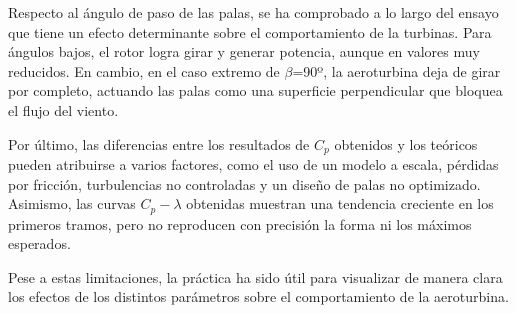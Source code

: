 \documentclass[10pt]{IEEEtran}
\begin{document}
Respecto al ángulo de paso de las palas, se ha comprobado a lo largo del ensayo que tiene un efecto determinante sobre el comportamiento de la turbinas. Para ángulos bajos, el rotor logra girar y generar potencia, aunque en valores muy reducidos. En cambio, en el caso extremo de $\beta$=90º, la aeroturbina deja de girar por completo, actuando las palas como una superficie perpendicular que bloquea el flujo del viento.

Por último, las diferencias entre los resultados de $C_p$ obtenidos y los teóricos pueden atribuirse a varios factores, como el uso de un modelo a escala, pérdidas por fricción, turbulencias no controladas y un diseño de palas no optimizado. Asimismo, las curvas $C_p - \lambda$ obtenidas muestran una tendencia creciente en los primeros tramos, pero no reproducen con precisión la forma ni los máximos esperados.

Pese a estas limitaciones, la práctica ha sido útil para visualizar de manera clara los efectos de los distintos parámetros sobre el comportamiento de la aeroturbina.
\end{document}
